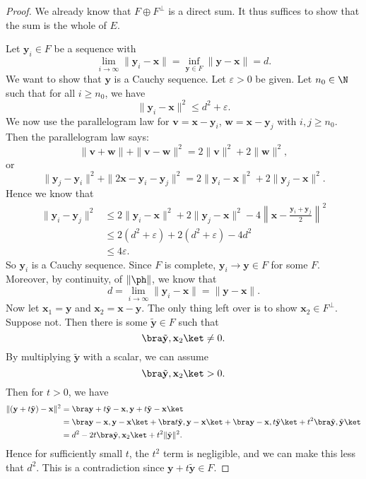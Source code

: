\documentclass[a4paper]{article}
\begin{document}
\begin{proof}
  We already know that $F \oplus F^\perp$ is a direct sum. It thus suffices to show that the sum is the whole of $E$.

  Let $\mathbf{y}_i \in F$ be a sequence with
  \[
    \lim_{i \to \infty} \|\mathbf{y}_i - \mathbf{x}\| = \inf_{\mathbf{y} \in F} \|\mathbf{y} - \mathbf{x}\| = d.
  \]
  We want to show that $\mathbf{y}$ is a Cauchy sequence. Let $\varepsilon > 0$ be given. Let $n_0 \in \N$ such that for all $i \geq n_0$, we have
  \[
    \|\mathbf{y}_i - \mathbf{x}\|^2 \leq d^2 + \varepsilon.
  \]
  We now use the parallelogram law for $\mathbf{v} = \mathbf{x} - \mathbf{y}_i$, $\mathbf{w} = \mathbf{x} - \mathbf{y}_j$ with $i, j \geq n_0$. Then the parallelogram law says:
  \[
    \|\mathbf{v} + \mathbf{w}\| + \|\mathbf{v} - \mathbf{w}\|^2 = 2\|\mathbf{v}\|^2 + 2\|\mathbf{w}\|^2,
  \]
  or
  \[
    \|\mathbf{y}_j - \mathbf{y}_i\|^2 + \|2\mathbf{x} - \mathbf{y}_i - \mathbf{y}_j\|^2 = 2\|\mathbf{y}_i - \mathbf{x}\|^2 + 2\|\mathbf{y}_j - \mathbf{x}\|^2.
  \]
  Hence we know that
  \begin{align*}
    \|\mathbf{y}_i - \mathbf{y}_j\|^2 &\leq 2\|\mathbf{y}_i - \mathbf{x}\|^2 + 2\|\mathbf{y}_j - \mathbf{x}\|^2 - 4\left\|\mathbf{x} - \frac{\mathbf{y}_i + \mathbf{y}_j}{2}\right\|^2\\
    &\leq 2(d^2 + \varepsilon) + 2(d^2 + \varepsilon) - 4d^2\\
    &\leq 4\varepsilon.
  \end{align*}
  So $\mathbf{y}_i$ is a Cauchy sequence. Since $F$ is complete, $\mathbf{y}_i \to \mathbf{y} \in F$ for some $F$. Moreover, by continuity, of $\|\ph\|$, we know that
  \[
    d = \lim_{i \to \infty}\|\mathbf{y}_i - \mathbf{x}\| = \|\mathbf{y} - \mathbf{x}\|.
  \]
  Now let $\mathbf{x}_1 = \mathbf{y}$ and $\mathbf{x}_2 = \mathbf{x} - \mathbf{y}$. The only thing left over is to show $\mathbf{x}_2 \in F^\perp$. Suppose not. Then there is some $\tilde{\mathbf{y}} \in F$ such that
  \[
    \bra \tilde{\mathbf{y}}, \mathbf{x}_2 \ket \not= 0.
  \]
  By multiplying $\tilde{\mathbf{y}}$ with a scalar, we can assume
  \[
    \bra \tilde{\mathbf{y}}, \mathbf{x}_2\ket > 0.
  \]
  Then for $t > 0$, we have
  \begin{align*}
    \|(\mathbf{y} + t\tilde{\mathbf{y}}) - \mathbf{x}\|^2 &= \bra \mathbf{y} + t\tilde{\mathbf{y}} - \mathbf{x}, \mathbf{y} + t\tilde{\mathbf{y}} - \mathbf{x}\ket \\
    &= \bra \mathbf{y} - \mathbf{x}, \mathbf{y} - \mathbf{x}\ket + \bra t\tilde{\mathbf{y}}, \mathbf{y} - \mathbf{x}\ket + \bra \mathbf{y} - \mathbf{x}, t\tilde{\mathbf{y}}\ket + t^2 \bra \tilde{\mathbf{y}}, \tilde{\mathbf{y}}\ket\\
    &= d^2 - 2t \bra \tilde{\mathbf{y}}, \mathbf{x}_2\ket + t^2 \|\tilde{\mathbf{y}}\|^2.
  \end{align*}
  Hence for sufficiently small $t$, the $t^2$ term is negligible, and we can make this less that $d^2$. This is a contradiction since $\mathbf{y} + t\tilde{\mathbf{y}} \in F$.
\end{proof}
\end{document}
